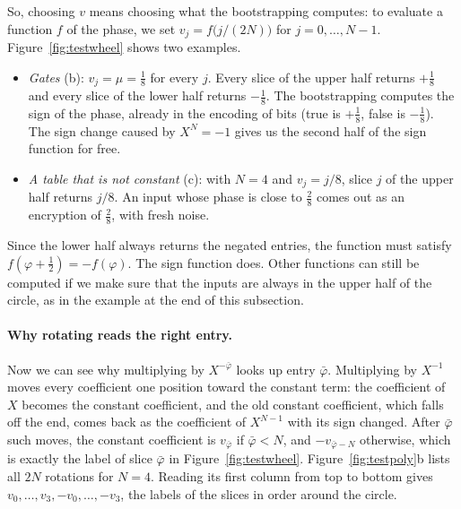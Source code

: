 \documentclass[12pt]{article}
\theoremstyle{plain}
\theoremstyle{definition}
\begin{document}
So, choosing $v$ means choosing what the bootstrapping computes: to evaluate a
function $f$ of the phase, we set $v_j=f\big(j/(2N)\big)$ for $j=0,\dots,N-1$.
Figure~\ref{fig:testwheel} shows two examples.
\begin{itemize}
  \item \emph{Gates} (b): $v_j=\mu=\frac18$ for every $j$. Every slice of the
        upper half returns $+\frac18$ and every slice of the lower half
        returns $-\frac18$. The bootstrapping computes the sign of the phase,
        already in the encoding of bits (\textsf{true} is $+\frac18$,
        \textsf{false} is $-\frac18$). The sign change caused by $X^N=-1$ gives
        us the second half of the sign function for free.
  \item \emph{A table that is not constant} (c): with $N=4$ and $v_j=j/8$, slice
        $j$ of the upper half returns $j/8$. An input whose phase is close to
        $\frac28$ comes out as an encryption of $\frac28$, with fresh noise.
\end{itemize}
Since the lower half always returns the negated entries, the function must
satisfy $f(\varphi+\frac12)=-f(\varphi)$. The sign function does. Other
functions can still be computed if we make sure that the inputs are always in
the upper half of the circle, as in the example at the end of this subsection.



\paragraph{Why rotating reads the right entry.}
Now we can see why multiplying by $X^{-\bar\varphi}$ looks up entry
$\bar\varphi$. Multiplying by $X^{-1}$ moves every coefficient one position
toward the constant term: the coefficient of $X$ becomes the constant
coefficient, and the old constant coefficient, which falls off the end, comes
back as the coefficient of $X^{N-1}$ with its sign changed. After $\bar\varphi$
such moves, the constant coefficient is $v_{\bar\varphi}$ if $\bar\varphi<N$, and
$-v_{\bar\varphi-N}$ otherwise, which is exactly the label of slice $\bar\varphi$
in Figure~\ref{fig:testwheel}. Figure~\ref{fig:testpoly}b lists all $2N$
rotations for $N=4$. Reading its first column from top to bottom gives
$v_0,\dots,v_3,-v_0,\dots,-v_3$, the labels of the slices in order around the
circle.


\end{document}

